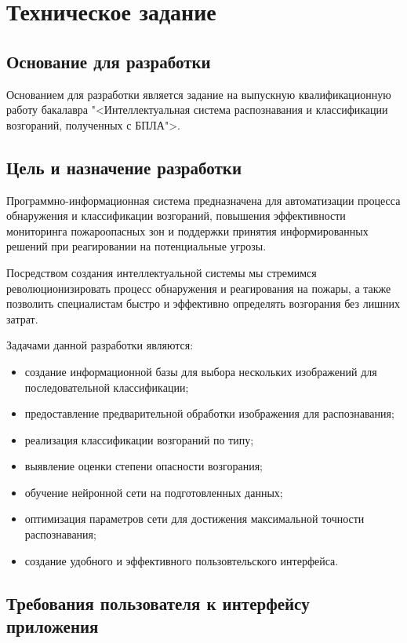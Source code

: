 \section{Техническое задание}
\subsection{Основание для разработки}


Основанием для разработки является задание на выпускную квалификационную работу бакалавра "<Интеллектуальная система распознавания и классификации возгораний, полученных с БПЛА">.

\subsection{Цель и назначение разработки}

Программно-информационная система предназначена для автоматизации процесса обнаружения и классификации возгораний, повышения эффективности мониторинга пожароопасных зон и поддержки принятия информированных решений при реагировании на потенциальные угрозы.

Посредством создания интеллектуальной системы мы стремимся революционизировать процесс обнаружения и реагирования на пожары, а также позволить специалистам быстро и эффективно определять возгорания без лишних затрат.

Задачами данной разработки являются:
\begin{itemize}
	\item создание информационной базы для выбора нескольких изображений для последовательной классификации;
	\item предоставление предварительной обработки изображения для распознавания;
	\item реализация классификации возгораний по типу;
	\item выявление оценки степени опасности возгорания;
	\item обучение нейронной сети на подготовленных данных;
	\item оптимизация параметров сети для достижения максимальной точности распознавания;
	\item создание удобного и эффективного пользовтельского интерфейса.
\end{itemize}

\subsection{Требования пользователя к интерфейсу приложения}

